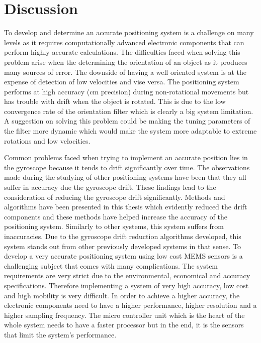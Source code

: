 \section{Discussion}
To develop and determine an accurate positioning system is a challenge on many levels as it requires computationally advanced electronic components that can perform highly accurate calculations. The difficulties faced when solving this problem arise when the determining the orientation of an object as it produces many sources of error. The downside of having a well oriented system is at the expense of detection of low velocities and vise versa. The positioning system performs at high accuracy (cm precision) during non-rotational movements but has trouble with drift when the object is rotated. This is due to the low convergence rate of the orientation filter which is clearly a big system limitation. A suggestion on solving this problem could be making the tuning parameters of the filter more dynamic which would make the system more adaptable to extreme rotations and low velocities.

Common problems faced when trying to implement an accurate position lies in the gyroscope because it tends to drift significantly over time. The observations made during the studying of other positioning systems have been that they all suffer in accuracy due the gyroscope drift. These findings lead to the consideration of reducing the gyroscope drift significantly. Methods and algorithms have been presented in this thesis which evidently reduced the drift components and these methods have helped increase the accuracy of the positioning system. Similarly to other systems, this system suffers from inaccuracies. Due to the gyroscope drift reduction algorithms developed, this system stands out from other previously developed systems in that sense. To develop a very accurate positioning system using low cost MEMS sensors is a challenging subject that comes with many complications. The system requirements are very strict due to the environmental, economical and accuracy specifications. Therefore implementing a system of very high accuracy, low cost and high mobility is very difficult. In order to achieve a higher accuracy, the electronic components need to have a higher performance, higher resolution and a higher sampling frequency. The micro controller unit which is the heart of the whole system needs to have a faster processor but in the end, it is the sensors that limit the system's performance.